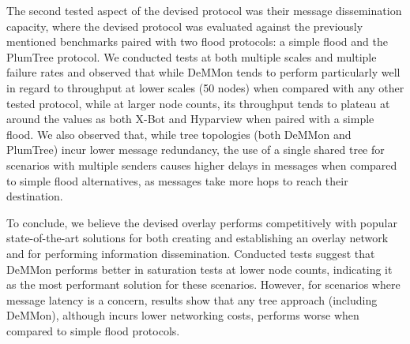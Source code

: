 The second tested aspect of the devised protocol was their message dissemination capacity, where the devised protocol was evaluated against the previously mentioned benchmarks paired with two flood protocols: a simple flood and the PlumTree protocol. We conducted tests at both multiple scales and multiple failure rates and observed that while DeMMon tends to perform particularly well in regard to throughput at lower scales (50 nodes) when compared with any other tested protocol, while at larger node counts, its throughput tends to plateau at around the values as both X-Bot and Hyparview when paired with a simple flood. We also observed that, while tree topologies (both DeMMon and PlumTree) incur lower message redundancy, the use of a single shared tree for scenarios with multiple senders causes higher delays in messages when compared to simple flood alternatives, as messages take more hops to reach their destination.

To conclude, we believe the devised overlay performs competitively with popular state-of-the-art solutions for both creating and establishing an overlay network and for performing information dissemination. Conducted tests suggest that DeMMon performs better in saturation tests at lower node counts, indicating it as the most performant solution for these scenarios. However, for scenarios where message latency is a concern, results show that any tree approach (including DeMMon), although incurs lower networking costs, performs worse when compared to simple flood protocols.



